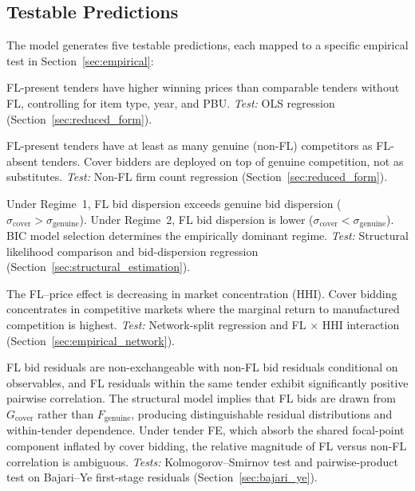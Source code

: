 
\subsection{Testable Predictions}
\label{sec:predictions}

The model generates five testable predictions, each mapped to a specific
empirical test in Section~\ref{sec:empirical}:

\begin{prediction}
\label{pred:price_v6}
FL-present tenders have higher winning prices than comparable tenders
without FL, controlling for item type, year, and PBU.
\emph{Test:} OLS regression (Section~\ref{sec:reduced_form}).
\end{prediction}

\begin{prediction}
\label{pred:selection_v6}
FL-present tenders have at least as many genuine (non-FL) competitors as
FL-absent tenders. Cover bidders are deployed on top of genuine
competition, not as substitutes.
\emph{Test:} Non-FL firm count regression (Section~\ref{sec:reduced_form}).
\end{prediction}

\begin{prediction}
\label{pred:regime_v6}
Under Regime~1, FL bid dispersion exceeds genuine bid dispersion
($\sigma_{\text{cover}} > \sigma_{\text{genuine}}$). Under Regime~2,
FL bid dispersion is lower ($\sigma_{\text{cover}} <
\sigma_{\text{genuine}}$). BIC model selection determines the
empirically dominant regime.
\emph{Test:} Structural likelihood comparison and bid-dispersion
regression (Section~\ref{sec:structural_estimation}).
\end{prediction}

\begin{prediction}
\label{pred:market_v6}
The FL--price effect is decreasing in market concentration (HHI).
Cover bidding concentrates in competitive markets where the marginal
return to manufactured competition is highest.
\emph{Test:} Network-split regression and FL $\times$ HHI interaction
(Section~\ref{sec:empirical_network}).
\end{prediction}

\begin{prediction}
\label{pred:exchange_v6}
FL bid residuals are non-exchangeable with non-FL bid residuals
conditional on observables, and FL residuals within the same tender
exhibit significantly positive pairwise correlation. The structural
model implies that FL bids are drawn from $G_{\text{cover}}$ rather
than $F_{\text{genuine}}$, producing distinguishable residual
distributions and within-tender dependence. Under tender FE, which
absorb the shared focal-point component inflated by cover bidding,
the relative magnitude of FL versus non-FL correlation is ambiguous.
\emph{Tests:} Kolmogorov--Smirnov test and pairwise-product test on
Bajari--Ye first-stage residuals (Section~\ref{sec:bajari_ye}).
\end{prediction}
